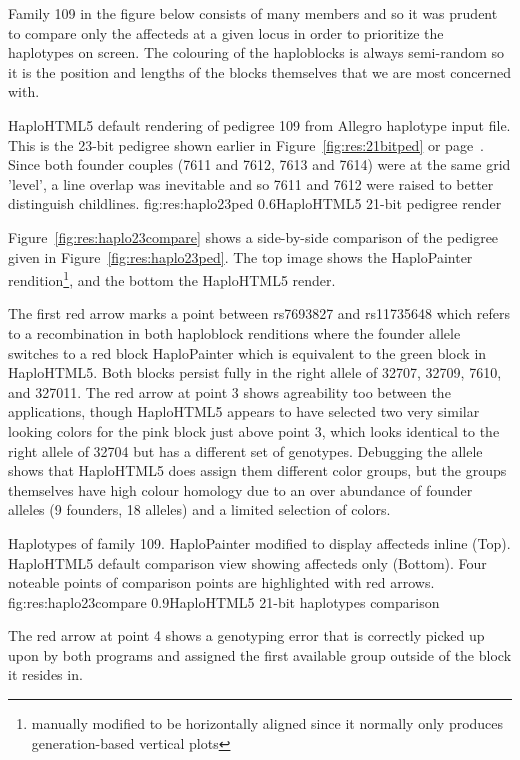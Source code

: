 Family 109 in the figure below consists of many members and so it was prudent to compare only the affecteds at a given locus in order to prioritize the haplotypes on screen. The colouring of the haploblocks is always semi-random so it is the position and lengths of the blocks themselves that we are most concerned with.

	{HaploHTML5 default rendering of pedigree 109 from Allegro haplotype input file. This is the 23-bit pedigree shown earlier in Figure~\ref{fig:res:21bitped} or page~\pageref{fig:res:21bitped}. Since both founder couples (7611 and 7612, 7613 and 7614) were at the same grid 'level', a line overlap was inevitable and so 7611 and 7612 were raised to better distinguish childlines.}
	{fig:res:haplo23ped}
	{0.6}{HaploHTML5 21-bit pedigree render}


Figure~\ref{fig:res:haplo23compare} shows a side-by-side comparison of the pedigree given in Figure~\ref{fig:res:haplo23ped}. The top image shows the HaploPainter rendition\footnote{manually modified to be horizontally aligned since it normally only produces generation-based vertical plots}, and the bottom the HaploHTML5 render.

The first red arrow marks a point between rs7693827 and rs11735648  which refers to a recombination in both haploblock renditions where the founder allele switches to a red block HaploPainter which is equivalent to the green block in HaploHTML5. Both blocks persist fully in the right allele of 32707, 32709, 7610, and 327011. The red arrow at point 3 shows agreability too between the applications, though HaploHTML5 appears to have selected two very similar looking colors for the pink block just above point 3, which looks identical to the right allele of 32704 but has a different set of genotypes. Debugging the allele shows that HaploHTML5 does assign them different color groups, but the groups themselves have high colour homology due to an over abundance of founder alleles (9 founders, 18 alleles) and a limited selection of colors. 

\pagebreak
{}
	{Haplotypes of family 109. HaploPainter modified to display affecteds inline (Top). HaploHTML5 default comparison view showing affecteds only (Bottom). Four noteable points of comparison points are highlighted with red arrows.}
	{fig:res:haplo23compare}
	{0.9}{HaploHTML5 21-bit haplotypes comparison}

The red arrow at point 4 shows a genotyping error that is correctly picked up upon by both programs and assigned the first available group outside of the block it resides in.

